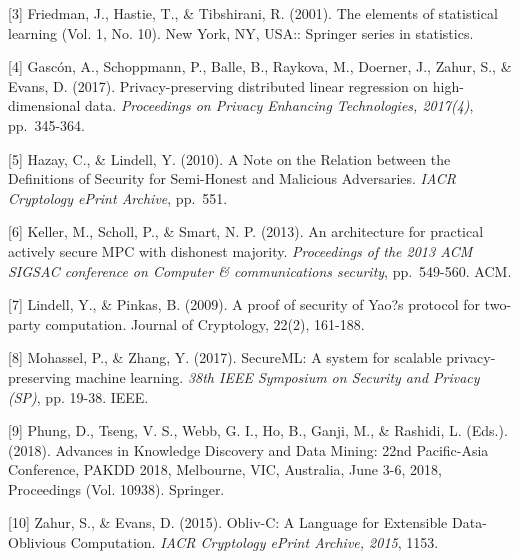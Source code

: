 \documentclass{article}
\begin{document}
[3] Friedman, J., Hastie, T., \& Tibshirani, R. (2001). The elements of statistical learning (Vol. 1, No. 10). New York, NY, USA:: Springer series in statistics.

[4] Gasc\'{o}n, A., Schoppmann, P., Balle, B., Raykova, M., Doerner, J., Zahur, S., \& Evans, D. (2017). Privacy-preserving distributed linear regression on high-dimensional data. {\it Proceedings on Privacy Enhancing Technologies, 2017(4)}, pp.\ 345-364.

[5] Hazay, C., \& Lindell, Y. (2010). A Note on the Relation between the Definitions of Security for Semi-Honest and Malicious Adversaries. {\it IACR Cryptology ePrint Archive}, pp.\ 551.

[6] Keller, M., Scholl, P., \& Smart, N. P. (2013). An architecture for practical actively secure MPC with dishonest majority. {\it Proceedings of the 2013 ACM SIGSAC conference on Computer \& communications security}, pp.\ 549-560. ACM.

[7] Lindell, Y., \& Pinkas, B. (2009). A proof of security of Yao?s protocol for two-party computation. Journal of Cryptology, 22(2), 161-188.

[8] Mohassel, P., \& Zhang, Y. (2017). SecureML: A system for scalable privacy-preserving machine learning. {\it 38th IEEE Symposium on Security and Privacy (SP)}, pp. 19-38. IEEE.

[9] Phung, D., Tseng, V. S., Webb, G. I., Ho, B., Ganji, M., \& Rashidi, L. (Eds.). (2018). Advances in Knowledge Discovery and Data Mining: 22nd Pacific-Asia Conference, PAKDD 2018, Melbourne, VIC, Australia, June 3-6, 2018, Proceedings (Vol. 10938). Springer.

[10] Zahur, S., \& Evans, D. (2015). Obliv-C: A Language for Extensible Data-Oblivious Computation. {\it IACR Cryptology ePrint Archive, 2015}, 1153.

\fi
\end{document}
